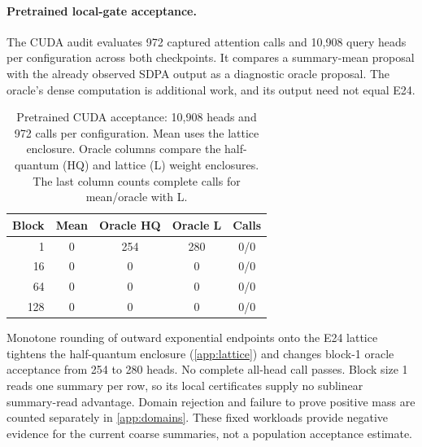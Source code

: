 \paragraph{Pretrained local-gate acceptance.}

The CUDA audit evaluates 972 captured attention calls and 10,908 query heads per configuration across both checkpoints. It compares a summary-mean proposal with the already observed SDPA output as a diagnostic oracle proposal. The oracle's dense computation is additional work, and its output need not equal E24.

\begin{table}[t]
\centering
\small
\caption{Pretrained CUDA acceptance: 10,908 heads and 972 calls per configuration. Mean uses the lattice enclosure. Oracle columns compare the half-quantum (HQ) and lattice (L) weight enclosures. The last column counts complete calls for mean/oracle with L.}
\label{tab:cudaacceptance}
\begin{tabular}{rcccc}
\toprule
Block & Mean & Oracle HQ & Oracle L & Calls \\
\midrule
1 & 0 & 254 & 280 & 0/0 \\
16 & 0 & 0 & 0 & 0/0 \\
64 & 0 & 0 & 0 & 0/0 \\
128 & 0 & 0 & 0 & 0/0 \\
\bottomrule
\end{tabular}
\end{table}

Monotone rounding of outward exponential endpoints onto the E24 lattice tightens the half-quantum enclosure (\cref{app:lattice}) and changes block-1 oracle acceptance from 254 to 280 heads. No complete all-head call passes. Block size 1 reads one summary per row, so its local certificates supply no sublinear summary-read advantage. Domain rejection and failure to prove positive mass are counted separately in \cref{app:domains}. These fixed workloads provide negative evidence for the current coarse summaries, not a population acceptance estimate.
